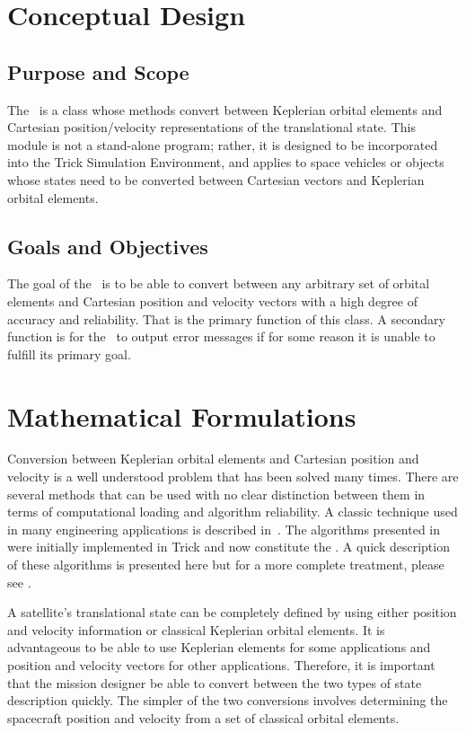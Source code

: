 \section{Conceptual Design}
\subsection{Purpose and Scope}
The \OrbitalElement\ is a class whose methods convert between Keplerian orbital
elements and Cartesian position/velocity representations of the translational state.
This module is not a stand-alone program; rather, it is designed to be
incorporated into the Trick Simulation Environment, and applies to space
vehicles or objects whose states need to be converted between Cartesian
vectors and Keplerian orbital elements.

\subsection{Goals and Objectives}
The goal of the \OrbitalElement\ is to be able to convert between
any arbitrary set of orbital elements and Cartesian position and velocity
vectors with a high degree of accuracy and reliability.  That is the primary
function of this class.  A secondary function is for the \OrbitalElement\
to output error messages if for some reason it is unable to fulfill its
primary goal.


\section{Mathematical Formulations}
Conversion between Keplerian orbital elements and Cartesian position and
velocity is a well understood problem that has been solved many times.  There
are several methods that can be used with no clear distinction between them
in terms of computational loading and algorithm reliability.  A classic
technique used in many engineering applications is described in~\cite{Vallado}.
The algorithms presented in~\cite{Vallado} were initially implemented in Trick and
now constitute the \OrbitalElement.  A quick description of these
algorithms is presented here but for a more complete treatment, please see
\cite{Vallado}.

A satellite's translational state can be completely defined by using either
position and velocity information or classical Keplerian orbital elements.
It is advantageous to be able to use Keplerian elements for some applications
and position and velocity vectors for other applications.  Therefore, it is
important that the mission designer be able to convert between the two types
of state description quickly.  The simpler of the two conversions involves
determining the spacecraft position and velocity from a set of classical
orbital elements.


